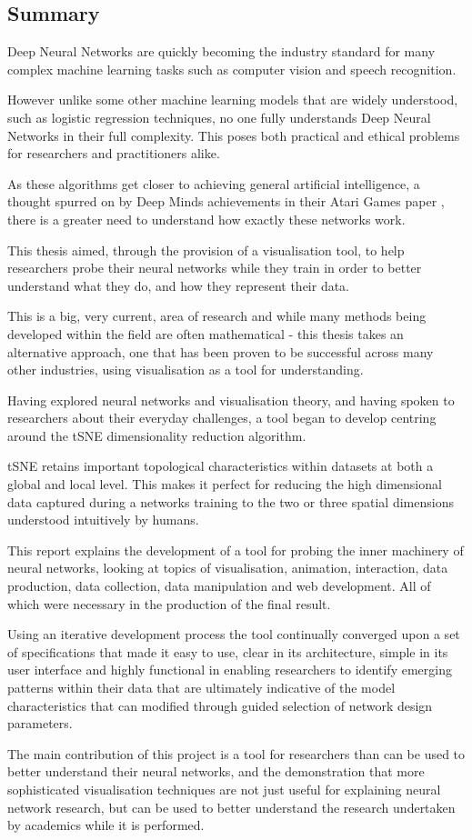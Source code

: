\documentclass[a4paper,11pt,titlepage]{article}
\begin{document}
\subsection{Summary}
Deep Neural Networks are quickly becoming the industry standard for many complex machine learning tasks such as computer vision and speech recognition.
\par 
However unlike some other machine learning models that are widely understood, such as logistic regression techniques, no one fully understands Deep Neural Networks in their full complexity. This poses both practical and ethical problems for researchers and practitioners alike.
\par 
As these algorithms get closer to achieving general artificial intelligence, a thought spurred on by Deep Minds achievements in their Atari Games paper \cite{Mnih2013a}, there is a greater need to understand how exactly these networks work.
\par 
This thesis aimed, through the provision of a visualisation tool, to help researchers probe their neural networks while they train in order to better understand what they do, and how they represent their data.
\par 
This is a big, very current, area of research and while many methods being developed within the field are often mathematical - this thesis takes an alternative approach, one that has been proven to be successful across many other industries, using visualisation as a tool for understanding.
\par 
Having explored neural networks and visualisation theory, and having spoken to researchers about their everyday challenges, a tool began to develop centring around the tSNE dimensionality reduction algorithm.
\par 
tSNE retains important topological characteristics within datasets at both a global and local level. This makes it perfect for reducing the high dimensional data captured during a networks training to the two or three spatial dimensions understood intuitively by humans. 
\par 
This report explains the development of a tool for probing the inner machinery of neural networks, looking at topics of visualisation, animation, interaction, data production, data collection, data manipulation and web development. All of which were necessary in the production of the final result.
\par 
Using an iterative development process the tool continually converged upon a set of specifications that made it easy to use, clear in its architecture, simple in its user interface and highly functional in enabling researchers to identify emerging patterns within their data that are ultimately indicative of the model characteristics that can modified through guided selection of network design parameters.
\par 
The main contribution of this project is a tool for researchers than can be used to better understand their neural networks, and the demonstration that more sophisticated visualisation techniques are not just useful for explaining neural network research, but can be used to better understand the research undertaken by academics while it is performed.
\end{document}
